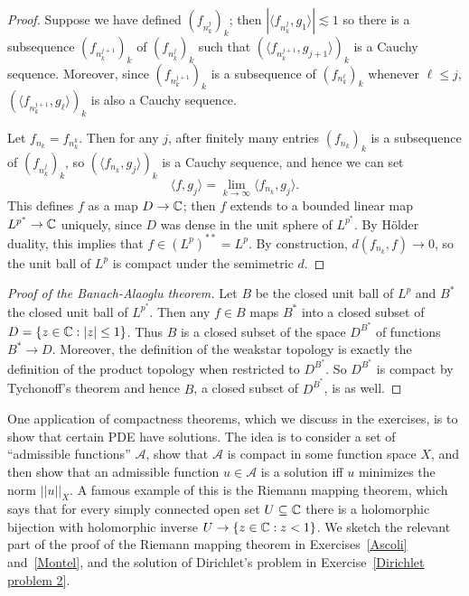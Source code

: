 \begin{proof}
Suppose we have defined ${(f_{n_{k}^{j}})}_{k}$; then $|\langle f_{n_{k}^{j}}, g_{1}\rangle| \lesssim 1$ so there is a subsequence ${(f_{n_{k}^{j+1}})}_{k}$ of ${(f_{n_{k}^{j}})}_{k}$ such that ${(\langle f_{n_{k}^{j+1}}, g_{j+1}\rangle)}_{k}$ is a Cauchy sequence.
Moreover, since ${(f_{n_{k}^{j+1}})}_{k}$ is a subsequence of ${(f_{n_{k}^{\ell}})}_{k}$ whenever $\ell \leq j$, ${(\langle f_{n_{k}^{j+1}}, g_{\ell}\rangle)}_{k}$ is also a Cauchy sequence.

Let $f_{n_{k}} = f_{n_{k}^{k}}$. Then for any $j$, after finitely many entries ${(f_{n_{k}})}_{k}$ is a subsequence of ${(f_{n_{k}^{j}})}_{k}$, so ${(\langle f_{n_{k}}, g_{j}\rangle)}_{k}$ is a Cauchy sequence, and hence we can set
\[\langle f, g_{j}\rangle = \lim_{k \to \infty} \langle f_{n_{k}}, g_{j}\rangle.\]
This defines $f$ as a map $D \to \mathbb{C}$; then $f$ extends to a bounded linear map $L^{p^{*}} \to \mathbb{C}$ uniquely, since $D$ was dense in the unit sphere of $L^{p^{*}}$.
By H\"older duality, this implies that $f \in {(L^{p})}^{**} = L^{p}$.
By construction, $d(f_{n_{k}}, f) \to 0$, so the unit ball of $L^{p}$ is compact under the semimetric $d$.
\end{proof}

\begin{proof}[Proof of the Banach-Alaoglu theorem]
Let $B$ be the closed unit ball of $L^{p}$ and $B^{*}$ the closed unit ball of $L^{p^{*}}$.
Then any $f \in B$ maps $B^{*}$ into a closed subset of $D = \{z \in \mathbb{C}: |z| \leq 1\}$.
Thus $B$ is a closed subset of the space $D^{B^{*}}$ of functions $B^{*} \to D$.
Moreover, the definition of the weakstar topology is exactly the definition of the product topology when restricted to $D^{B^{*}}$.
So $D^{B^{*}}$ is compact by Tychonoff's theorem and hence $B$, a closed subset of $D^{B^{*}}$, is as well.
\end{proof}

One application of compactness theorems, which we discuss in the exercises, is to show that certain PDE have solutions.
The idea is to consider a set of ``admissible functions'' $\mathcal A$, show that $\mathcal A$ is compact in some function space $X$, and then show that an admissible function $u \in \mathcal A$ is a solution iff $u$ minimizes the norm $||u||_{X}$.
A famous example of this is the Riemann mapping theorem, which says that for every simply connected open set $U \subseteq \mathbb{C}$ there is a holomorphic bijection with holomorphic inverse $U \to \{z \in \mathbb{C}: z < 1\}$.
We sketch the relevant part of the proof of the Riemann mapping theorem in Exercises~\ref{Ascoli} and~\ref{Montel}, and the solution of Dirichlet's problem in Exercise~\ref{Dirichlet problem 2}.

